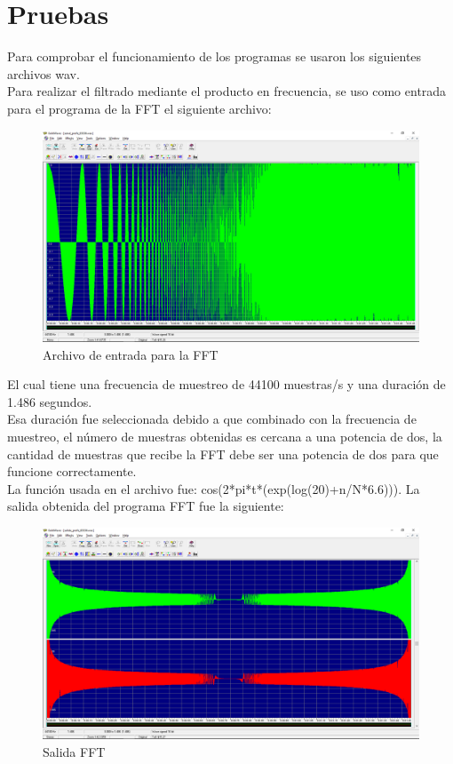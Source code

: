 \section{Pruebas}
Para comprobar el funcionamiento de los programas se usaron los siguientes archivos wav.\\
Para realizar el filtrado mediante el producto en frecuencia, se uso como entrada para el programa de la FFT el siguiente archivo:
\begin{figure}[H]
	\centering
	\includegraphics[scale=.35]{img/entrada.png}
	\caption{Archivo de entrada para la FFT}
	\label{fig:prueba1}		
\end{figure}
El cual tiene una frecuencia de muestreo de 44100 muestras/s y una duración de 1.486 segundos.\\ Esa duración fue seleccionada debido a que combinado con la frecuencia de muestreo, el número de muestras obtenidas es cercana a una potencia de dos, la cantidad de muestras que recibe la FFT debe ser una potencia de dos para que funcione correctamente.\\La función usada en el archivo fue: cos(2*pi*t*(exp(log(20)+n/N*6.6))).\newpage
La salida obtenida del programa FFT fue la siguiente:
\begin{figure}[H]
	\centering
	\includegraphics[scale=.35]{img/salidaTDF.png}
	\caption{Salida FFT}
	\label{fig:prueba2}		
\end{figure}
